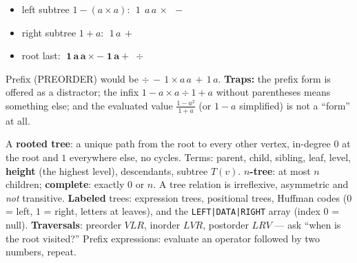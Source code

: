 \documentclass{fkt-notes}
\theoremstyle{definition}
\begin{document}
\begin{example}
  \leavevmode\par\noindent
  \begin{minipage}[c]{0.3\textwidth}
    \centering
  \end{minipage}\hfill
  \begin{minipage}[c]{0.66\textwidth}
    \begin{itemize}[nosep]
      \item left subtree $1 - (a \times a)$: $\;1\ \ a\,a\,\times\ \ -$
      \item right subtree $1 + a$: $\;1\,a\,+$
      \item root last: $\;\mathbf{1\,a\,a \times - \;1\,a + \;\div}$
    \end{itemize}
    Prefix (PREORDER) would be $\div\, -\, 1 \times a\,a\, +\, 1\,a$.
    \textbf{Traps:} the prefix form is offered as a distractor; the
    infix $1 - a \times a \div 1 + a$ without parentheses means
    something else; and the evaluated value $\frac{1-a^2}{1+a}$ (or
    $1 - a$ simplified) is not a ``form'' at all.
  \end{minipage}
\end{example}

\begin{keybox}[title=Key points (7.1--7.3)]
  A \textbf{rooted tree}: a unique path from the root to every other
  vertex, in-degree $0$ at the root and $1$ everywhere else, no cycles.
  Terms: parent, child, sibling, leaf, level, \textbf{height} (the highest
  level), descendants, subtree $T(v)$. \textbf{$n$-tree}: at most $n$
  children; \textbf{complete}: exactly $0$ or $n$. A tree relation is
  irreflexive, asymmetric and \emph{not} transitive. \textbf{Labeled}
  trees: expression trees, positional trees, Huffman codes ($0$ = left,
  $1$ = right, letters at leaves), and the \texttt{LEFT|DATA|RIGHT} array
  (index $0$ = null). \textbf{Traversals}: preorder $VLR$, inorder $LVR$,
  postorder $LRV$ --- ask ``when is the root visited?'' Prefix expressions:
  evaluate an operator followed by two numbers, repeat.
\end{keybox}
\end{document}
